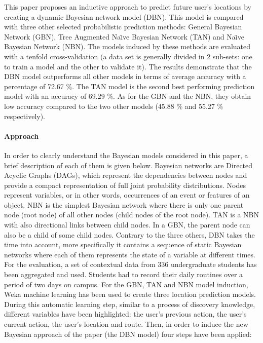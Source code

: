 This paper proposes an inductive approach to predict future user's locations by creating a dynamic Bayesian network model (DBN). This model is compared with three other selected probabilistic prediction methods: General Bayesian Network (GBN), Tree Augmented Na\"{\i}ve Bayesian Network (TAN) and Na\"{\i}ve Bayesian Network (NBN). The models induced by these methods are evaluated with a tenfold cross-validation (a data set is generally divided in 2 sub-sets: one to train a model and the other to validate it). The results demonstrate that the DBN model outperforms all other models in terms of average accuracy with a percentage of 72.67 \%. The TAN model is the second best performing prediction model with an accuracy of 69.29 \%. As for the GBN and the NBN, they obtain low accuracy compared to the two other models (45.88 \% and 55.27 \% respectively). 

\paragraph{Approach}

In order to clearly understand the Bayesian models considered in this paper, a brief description of each of them is given below. Bayesian networks are Directed Acyclic Graphs (DAGs), which represent the dependencies between nodes and provide a compact representation of full joint probability distributions. Nodes represent variables, or in other words, occurrences of an event or features of an object. NBN is the simplest Bayesian network where there is only one parent node (root node) of all other nodes (child nodes of the root node). TAN is a NBN with also directional links between child nodes. In a GBN, the parent node can also be a child of some child nodes. Contrary to the three others, DBN takes the time into account, more specifically it contains a sequence of static Bayesian networks where each of them represents the state of a variable at different times.
For the evaluation, a set of contextual data from 336 undergraduate students has been aggregated and used. Students had to record their daily routines over a period of two days on campus. For the GBN, TAN and NBN model induction, Weka machine learning has been used to create three location prediction models. During this automatic learning step, similar to a process of discovery knowledge, different variables have been highlighted: the user's previous action, the user's current action, the user's location and route. Then, in order to induce the new Bayesian approach of the paper (the DBN model) four steps have been applied:


